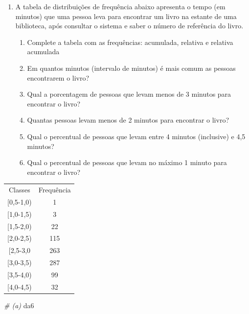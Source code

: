 \documentclass[]{article}
\newenvironment{Shaded}{\begin{snugshade}}{\end{snugshade}}
\newcommand{\CommentTok}[1]{\textcolor[rgb]{0.56,0.35,0.01}{\textit{#1}}}
\newcommand{\NormalTok}[1]{#1}
\providecommand{\tightlist}{%
  \setlength{\itemsep}{0pt}\setlength{\parskip}{0pt}}
\begin{document}
\begin{enumerate}
\def\labelenumi{\arabic{enumi}.}
\setcounter{enumi}{5}
\tightlist
\item
  A tabela de distribuições de frequência abaixo apresenta o tempo (em
  minutos) que uma pessoa leva para encontrar um livro na estante de uma
  biblioteca, após consultar o sistema e saber o número de referência do
  livro.

  \begin{enumerate}
  \def\labelenumii{(\alph{enumii})}
  \tightlist
  \item
    Complete a tabela com as frequências: acumulada, relativa e relativa
    acumulada
  \item
    Em quantos minutos (intervalo de minutos) é mais comum as pessoas
    encontrarem o livro?
  \item
    Qual a porcentagem de pessoas que levam menos de 3 minutos para
    encontrar o livro?
  \item
    Quantas pessoas levam menos de 2 minutos para encontrar o livro?
  \item
    Qual o percentual de pessoas que levam entre 4 minutos (inclusive) e
    4,5 minutos?
  \item
    Qual o percentual de pessoas que levam no máximo 1 minuto para
    encontrar o livro?
  \end{enumerate}
\end{enumerate}

\begin{table}[H]
\centering
\begin{tabular}{cc}
\hline
Classes     & Frequência \\ \cline{1-2}
{[}0,5-1,0) & 1          \\
{[}1,0-1,5) & 3          \\
{[}1,5-2,0) & 22         \\
{[}2,0-2,5) & 115        \\
{[}2,5-3,0  & 263        \\
{[}3,0-3,5) & 287        \\
{[}3,5-4,0) & 99         \\
{[}4,0-4,5) & 32         \\ \hline
\end{tabular}
\end{table}

\begin{Shaded}
\begin{Highlighting}[]
\CommentTok{# (a)}
\NormalTok{da6}
\end{Highlighting}
\end{Shaded}
\end{document}
